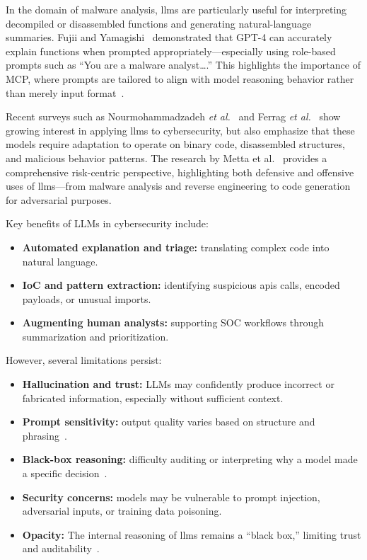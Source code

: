 In the domain of malware analysis, \glspl{llm} are particularly useful for interpreting decompiled
or disassembled functions and generating natural-language summaries. Fujii and
Yamagishi~\cite{fujii2024llm} demonstrated that GPT-4 can accurately explain functions when
prompted appropriately—especially using role-based prompts such as “You are a malware analyst….”
This highlights the importance of MCP, where prompts are tailored to align with model reasoning
behavior rather than merely input format~\cite{sahoo2024systematic}.

Recent surveys such as Nourmohammadzadeh \emph{et al.}~\cite{nourmohammadzadeh2024llmsurvey} and
Ferrag \emph{et al.}~\cite{ferrag2024allinsights} show growing interest in applying \glspl{llm} to
cybersecurity, but also emphasize that these models require adaptation to operate on binary code,
disassembled structures, and malicious behavior patterns. The research by Metta et
al.~\cite{metta2024generativeai} provides a comprehensive risk-centric perspective, highlighting
both defensive and offensive uses of \glspl{llm}—from malware analysis and reverse engineering to
code generation for adversarial purposes.

Key benefits of \gls{LLMs} in cybersecurity include:
\begin{itemize}
	\item \textbf{Automated explanation and triage:} translating complex code into natural language.
	\item \textbf{IoC and pattern extraction:} identifying suspicious \glspl{api} calls, encoded payloads, or unusual imports.
	\item \textbf{Augmenting human analysts:} supporting SOC workflows through summarization and prioritization.
\end{itemize}

However, several limitations persist:
\begin{itemize}
	\item \textbf{Hallucination and trust:} \gls{LLMs} may confidently produce
	      incorrect or fabricated information, especially without sufficient context.
	\item \textbf{Prompt sensitivity:} output quality varies based on structure
	      and phrasing~\cite{sahoo2024systematic}.
	\item \textbf{Black-box reasoning:} difficulty auditing or interpreting why
	      a model made a specific decision~\cite{metta2024generativeai}.
	\item \textbf{Security concerns:} models may be vulnerable to prompt
	      injection, adversarial inputs, or training data poisoning.
	\item \textbf{Opacity:} The internal reasoning of \glspl{llm} remains a “black box,” limiting trust and auditability~\cite{nourmohammadzadeh2024llmsurvey}.
\end{itemize}

